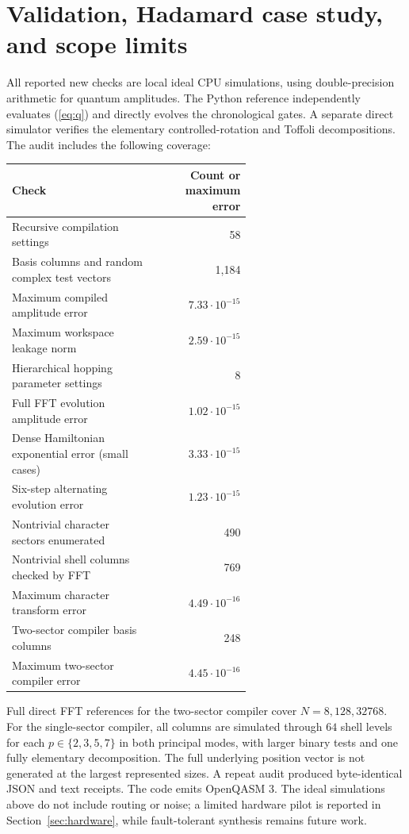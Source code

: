 \documentclass[11pt]{article}
\begin{document}
\section{Validation, Hadamard case study, and scope limits}
All reported new checks are local ideal CPU simulations, using double-precision arithmetic for quantum amplitudes. The Python reference independently evaluates (\ref{eq:q}) and directly evolves the chronological gates. A separate direct simulator verifies the elementary controlled-rotation and Toffoli decompositions. The audit includes the following coverage:
\begin{center}\small
\begin{tabular}{p{0.60\linewidth}r}
\toprule
Check & Count or maximum error\\
\midrule
Recursive compilation settings & 58\\
Basis columns and random complex test vectors & 1,184\\
Maximum compiled amplitude error & $7.33\cdot10^{-15}$\\
Maximum workspace leakage norm & $2.59\cdot10^{-15}$\\
Hierarchical hopping parameter settings & 8\\
Full FFT evolution amplitude error & $1.02\cdot10^{-15}$\\
Dense Hamiltonian exponential error (small cases) & $3.33\cdot10^{-15}$\\
Six-step alternating evolution error & $1.23\cdot10^{-15}$\\
Nontrivial character sectors enumerated & 490\\
Nontrivial shell columns checked by FFT & 769\\
Maximum character transform error & $4.49\cdot10^{-16}$\\
Two-sector compiler basis columns & 248\\
Maximum two-sector compiler error & $4.45\cdot10^{-16}$\\
\bottomrule
\end{tabular}
\end{center}
Full direct FFT references for the two-sector compiler cover $N=8,128,32768$. For the single-sector compiler, all columns are simulated through $64$ shell levels for each $p\in\{2,3,5,7\}$ in both principal modes, with larger binary tests and one fully elementary decomposition. The full underlying position vector is not generated at the largest represented sizes. A repeat audit produced byte-identical JSON and text receipts. The code emits OpenQASM 3. The ideal simulations above do not include routing or noise; a limited hardware pilot is reported in Section~\ref{sec:hardware}, while fault-tolerant synthesis remains future work.
\end{document}
